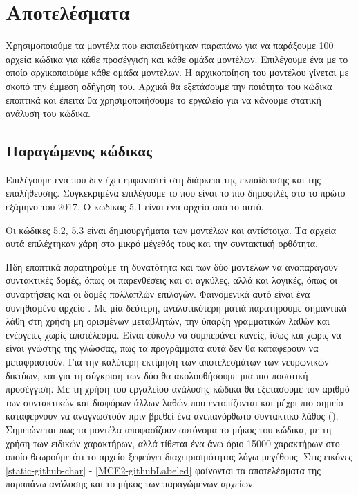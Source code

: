 \section{Αποτελέσματα}

Χρησιμοποιούμε τα μοντέλα που εκπαιδεύτηκαν παραπάνω για να παράξουμε 100 αρχεία κώδικα για κάθε προσέγγιση και κάθε ομάδα μοντέλων.
Επιλέγουμε ένα  με το οποίο αρχικοποιούμε κάθε ομάδα μοντέλων. 
Η αρχικοποίηση του μοντέλου γίνεται με σκοπό την έμμεση οδήγηση του.
Αρχικά θα εξετάσουμε την ποιότητα του κώδικα εποπτικά και έπειτα θα χρησιμοποιήσουμε το εργαλείο  για να κάνουμε στατική ανάλυση του κώδικα.

\subsection{ Παραγώμενος κώδικας}

Επιλέγουμε ένα  που δεν έχει εμφανιστεί στη διάρκεια της εκπαίδευσης και της επαλήθευσης.
Συγκεκριμένα επιλέγουμε το  που είναι το πιο δημοφιλές  στο  το πρώτο εξάμηνο του 2017.
Ο κώδικας 5.1 είναι ένα αρχείο από το  αυτό.



Οι κώδικες 5.2, 5.3 είναι δημιουργήματα των μοντέλων  και  αντίστοιχα. Τα αρχεία αυτά επιλέχτηκαν χάρη στο μικρό μέγεθός τους και την συντακτική ορθότητα.



Ήδη εποπτικά παρατηρούμε τη δυνατότητα και των δύο μοντέλων να αναπαράγουν συντακτικές δομές, όπως οι παρενθέσεις και οι αγκύλες, αλλά και λογικές, όπως οι συναρτήσεις και οι δομές πολλαπλών επιλογών.
Φαινομενικά αυτό είναι ένα συνηθισμένο αρχείο .
Με μία δεύτερη, αναλυτικότερη ματιά παρατηρούμε σημαντικά λάθη στη χρήση μη ορισμένων μεταβλητών, την ύπαρξη γραμματικών λαθών και ενέργειες χωρίς αποτέλεσμα. 
Είναι εύκολο να συμπεράνει κανείς, ίσως και χωρίς να είναι γνώστης της γλώσσας, πως τα προγράμματα αυτά δεν θα καταφέρουν να μεταφραστούν. 
Για την καλύτερη εκτίμηση των αποτελεσμάτων των νευρωνικών δικτύων, και για τη σύγκριση των δύο  θα ακολουθήσουμε μια πιο ποσοτική προσέγγιση. 
Με τη χρήση του εργαλείου ανάλυσης κώδικα  θα εξετάσουμε τον αριθμό των συντακτικών και διαφόρων άλλων λαθών που εντοπίζονται και μέχρι πιο σημείο καταφέρνουν να αναγνωστούν πριν βρεθεί ένα ανεπανόρθωτο συντακτικό λάθος ().
Σημειώνεται πως τα μοντέλα αποφασίζουν αυτόνομα το μήκος του κώδικα, με τη χρήση των ειδικών χαρακτήρων, αλλά τίθεται ένα άνω όριο 15000 χαρακτήρων στο οποίο θεωρούμε ότι το αρχείο ξεφεύγει διαχειρισιμότητας λόγω μεγέθους.
Στις εικόνες \ref{static-github-char} - \ref{MCE2-githubLabeled} φαίνονται τα αποτελέσματα της παραπάνω ανάλυσης και το μήκος των παραγώμενων αρχείων.

